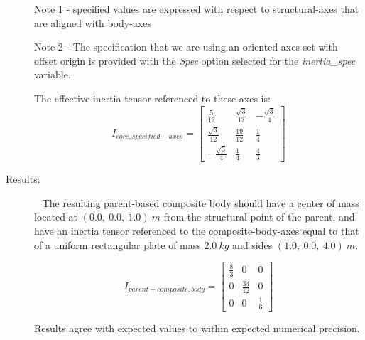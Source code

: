 \begin{description}
Note 1 - specified values are expressed with respect to structural-axes that 
are aligned with body-axes  

Note 2 - The specification that we are using an oriented axes-set with offset 
origin is provided with the \textit{Spec} option selected for the 
\textit{inertia\_spec} variable.
 
 The effective inertia tensor referenced to these axes is:
 \begin{equation*}
I_{core, specified-axes} = 
   \begin{bmatrix} \frac{5}{12} & \frac{\sqrt{3}}{12}   & -\frac{\sqrt{3}}{4}  
   \\
                   \frac{\sqrt{3}}{12}   & \frac{19}{12} & \frac{1}{4}   \\
                    -\frac{\sqrt{3}}{4}  & \frac{1}{4}   & \frac{4}{3} 
   \end{bmatrix}
\end{equation*}


 
\item[Results:]\ \newline
The resulting parent-based composite body should have a center of mass located 
at $(0.0,~0.0,~1.0)~m$ from the structural-point of the parent, and have an 
inertia tensor referenced to the composite-body-axes equal to that of a 
uniform rectangular plate of mass $2.0~kg$ and sides $(1.0,~0.0,~4.0)~m$.

\begin{equation*}
I_{parent-composite,body} = 
   \begin{bmatrix} \frac{8}{3} & 0   & 0  \\
                   0   & \frac{34}{12} & 0   \\
                    0  & 0   & \frac{1}{6} 
   \end{bmatrix}
\end{equation*} 

Results agree with expected values to within expected numerical precision.
\end{description}


















